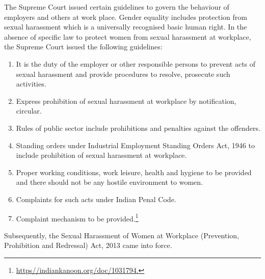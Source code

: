 \begin{multicols}{2}
\noi
The Supreme Court issued certain guidelines to govern the behaviour of employers and
others at work place. Gender equality includes protection from sexual harassment which is a
universally recognised basic human right. In the absence of specific law to protect women
from sexual harassment at workplace, the Supreme Court issued the following guidelines:

\vspace{-.3cm}

\begin{enumerate}
\item It is the duty of the employer or other responsible persons to prevent acts of sexual
harassment and provide procedures to resolve, prosecute such activities.

\item Express prohibition of sexual harassment at workplace by notification, circular.

\item Rules of public sector include prohibitions and penalties against the offenders.

\item Standing orders under Industrial Employment Standing Orders Act, 1946 to include
prohibition of sexual harassment at workplace.

\item Proper working conditions, work leisure, health and hygiene to be provided and there
should not be any hostile environment to women.

\item Complaints for such acts under Indian Penal Code.

\item Complaint mechanism to be provided.\footnote{\url{https//indiankanoon.org/doc/1031794.}}

\vspace{-.5cm}

\end{enumerate}


\noi
Subsequently, the Sexual Harassment of Women at Workplace (Prevention, Prohibition and
Redressal) Act, 2013 came into force.

\vspace{.1cm}


\vspace{.1cm}


\end{multicols}
